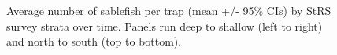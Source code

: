 \documentclass[12pt]{article}\usepackage[]{graphicx}\usepackage[]{color}
\begin{document}
\begin{figure}[htb]

{\centering {} 

}

\caption{Average number of sablefish per trap (mean +/- 95\% CIs) by StRS survey strata over time. Panels run deep to shallow (left to right) and north to south (top to bottom).}\label{fig:figure8}
\end{figure}
\clearpage
\end{document}
